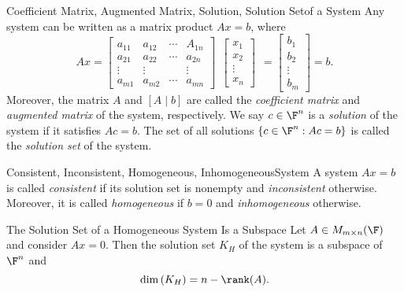 \documentclass[linearalgebra]{subfiles}
\begin{document}
    \begin{definition}{Coefficient Matrix, Augmented Matrix, Solution, Solution Set}{of a System}
        Any system can be written as a matrix product $Ax = b$, where
        \begin{equation*}
            Ax = 
            \begin{bmatrix}
                a_{11} & a_{12} & \cdots & A_{1n} \\ a_{21} & a_{22} & \cdots & a_{2n} \\ \vdots & \vdots & & \vdots \\ a_{m1} & a_{m2} & \cdots & a_{mn}
            \end{bmatrix} \ \ 
            \begin{bmatrix}
                x_1 \\ x_2 \\ \vdots \\ x_n
            \end{bmatrix} \ \ 
            =
            \begin{bmatrix}
                b_1 \\ b_2 \\ \vdots \\ b_m
            \end{bmatrix}
            = b.
        \end{equation*}
        Moreover, the matrix $A$ and $[A\mid b]$ are called the \emph{coefficient matrix} and \emph{augmented matrix} of the system, respectively. We say $c\in \F^n$ is a \emph{solution} of the system if it satisfies $Ac=b$. The set of all solutions $\left\lbrace c\in \F^n: Ac=b \right\rbrace$ is called the \emph{solution set} of the system.
    \end{definition}

    \begin{definition}{Consistent, Inconsistent, Homogeneous, Inhomogeneous}{System}
        A system $Ax= b$ is called \emph{consistent} if its solution set is nonempty and \emph{inconsistent} otherwise. Moreover, it is called \emph{homogeneous} if $b=0$ and \emph{inhomogeneous} otherwise.
    \end{definition}

    \begin{prop}{The Solution Set of a Homogeneous System Is a Subspace}
        Let $A\in M_{m\times n}(\F)$ and consider $Ax=0$. Then the solution set $K_H$ of the system is a subspace of $\F^n$ and
        \begin{equation*}
            \dim\left( K_H \right)  = n - \rank(A).
        \end{equation*}
    \end{prop}
\end{document}
